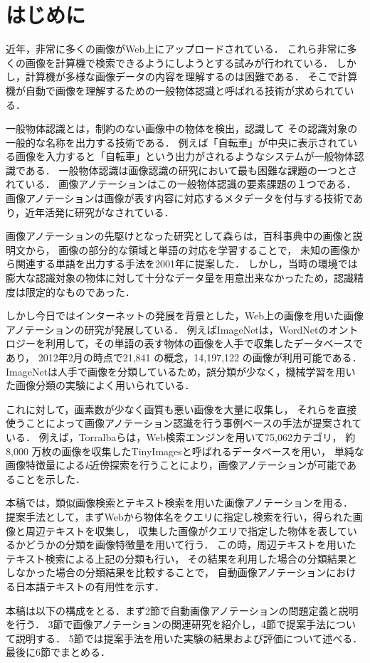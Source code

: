 \chapter{はじめに}
 近年，非常に多くの画像がWeb上にアップロードされている．
これら非常に多くの画像を計算機で検索できるようにしようとする試みが行われている．
しかし，計算機が多様な画像データの内容を理解するのは困難である．
そこで計算機が自動で画像を理解するための一般物体認識と呼ばれる技術が求められている\cite{yanai}．

一般物体認識とは，制約のない画像中の物体を検出，認識して
その認識対象の一般的な名称を出力する技術である．
例えば「自転車」が中央に表示されている画像を入力すると「自転車」という出力がされるようなシステムが一般物体認識である．
一般物体認識は画像認識の研究において最も困難な課題の一つとされている．
画像アノテーションはこの一般物体認識の要素課題の１つである．
画像アノテーションは画像が表す内容に対応するメタデータを付与する技術であり，近年活発に研究がなされている\cite{jeon,watanabe}．

画像アノテーションの先駆けとなった研究として森ら\cite{mori}は，百科事典中の画像と説明文から，
画像の部分的な領域と単語の対応を学習することで，
未知の画像から関連する単語を出力する手法を2001年に提案した．
しかし，当時の環境では膨大な認識対象の物体に対して十分なデータ量を用意出来なかったため，認識精度は限定的なものであった．

しかし今日ではインターネットの発展を背景とした，Web上の画像を用いた画像アノテーションの研究が発展している．
例えばImageNet\cite{imagenet}は，WordNetのオントロジーを利用して，その単語の表す物体の画像を人手で収集したデータベースであり，
2012年2月の時点で21,841 の概念，14,197,122 の画像が利用可能である．
ImageNetは人手で画像を分類しているため，誤分類が少なく，機械学習を用いた画像分類の実験によく用いられている． 

これに対して，画素数が少なく画質も悪い画像を大量に収集し，
それらを直接使うことによって画像アノテーション認識を行う事例ベースの手法が提案されている．
例えば，Torralba\cite{torralba}らは，Web検索エンジンを用いて75,062カテゴリ，
約8,000 万枚の画像を収集したTinyImagesと呼ばれるデータベースを用い，
単純な画像特徴量による{\it k}近傍探索を行うことにより，画像アノテーションが可能であることを示した．

本稿では，類似画像検索とテキスト検索を用いた画像アノテーションを用る．
提案手法として，まずWebから物体名をクエリに指定し検索を行い，得られた画像と周辺テキストを収集し，
収集した画像がクエリで指定した物体を表しているかどうかの分類を画像特徴量を用いて行う．
この時，周辺テキストを用いたテキスト検索による上記の分類も行い，
その結果を利用した場合の分類結果としなかった場合の分類結果を比較することで，
自動画像アノテーションにおける日本語テキストの有用性を示す．

本稿は以下の構成をとる．まず2節で自動画像アノテーションの問題定義と説明を行う．
3節で画像アノテーションの関連研究を紹介し，4節で提案手法について説明する．
5節では提案手法を用いた実験の結果および評価について述べる．最後に6節でまとめる．